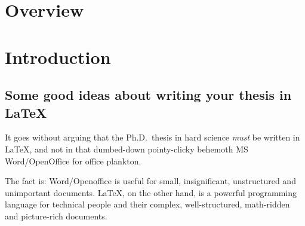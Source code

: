 \documentclass[a4paper,11pt,phdthesis,twoside,oneandhalfspace]{cssethesis}  %
\begin{document}


\frontmatter					%

\thesistitlepage				%

\thesiscopyrightpage			%

\thesisdeclarationpage			%



\tableofcontents				%










\mainmatter	%



\chapter{Overview}





\chapter{Introduction}

\section{Some good ideas about writing your thesis in LaTeX}

It goes without arguing that the Ph.D.~thesis in hard science
\emph{must} be written in LaTeX, and not in that dumbed-down
pointy-clicky behemoth MS Word/OpenOffice for office plankton.

The fact is: Word/Openoffice is useful for small, insignificant,
unstructured and unimportant documents. LaTeX, on the other hand,
is a powerful programming language for technical people and their
complex, well-structured, math-ridden and picture-rich documents.
\end{document}
